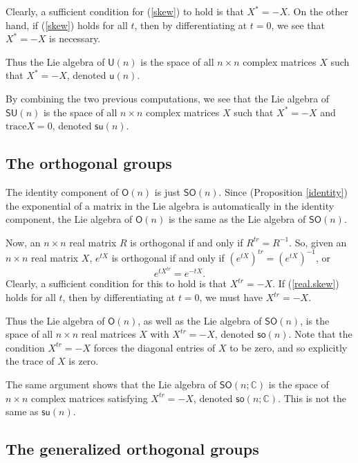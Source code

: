 \documentclass[12pt]{amsbook}
\theoremstyle{plain}
\numberwithin{equation}{chapter}
\numberwithin{theorem}{chapter}
\begin{document}
Clearly, a sufficient condition for (\ref{skew}) to hold is that $X^{*}=-X$.
On the other hand, if (\ref{skew}) holds for all $t$, then by differentiating
at $t=0$, we see that $X^{*}=-X$ is necessary.

Thus the Lie algebra of $\mathsf{U}(n)$ is the space of all $n\times n$
complex matrices $X$ such that $X^{*}=-X$, denoted $\mathsf{u}(n)$.

By combining the two previous computations, we see that the Lie algebra of
$\mathsf{SU}(n)$ is the space of all $n\times n$ complex matrices $X$ such
that $X^{*}=-X$ and $\mathrm{trace}X=0$, denoted $\mathsf{su}(n)$.

\subsection{The orthogonal groups}

The identity component of $\mathsf{O}(n)$ is just $\mathsf{SO}(n)$. Since
(Proposition \ref{identity}) the exponential of a matrix in the Lie algebra is
automatically in the identity component, the Lie algebra of $\mathsf{O}(n) $
is the same as the Lie algebra of $\mathsf{SO}(n)$.

Now, an $n\times n$ real matrix $R$ is orthogonal if and only if
$R^{tr}=R^{-1}$. So, given an $n\times n$ real matrix $X$, $e^{tX}$ is
orthogonal if and only if $(e^{tX})^{tr}=(e^{tX})^{-1}$, or
\begin{equation}
e^{tX^{tr}}=e^{-tX}\text{.}\label{real.skew}%
\end{equation}
Clearly, a sufficient condition for this to hold is that $X^{tr}=-X$. If
(\ref{real.skew}) holds for all $t$, then by differentiating at $t=0$, we must
have $X^{tr}=-X$.

Thus the Lie algebra of $\mathsf{O}(n)$, as well as the Lie algebra of
$\mathsf{SO}(n)$, is the space of all $n\times n$ real matrices $X$ with
$X^{tr}=-X$, denoted $\mathsf{so}(n)$. Note that the condition $X^{tr}=-X$
forces the diagonal entries of $X$ to be zero, and so explicitly the trace of
$X$ is zero.

The same argument shows that the Lie algebra of $\mathsf{SO}(n;\mathbb{C})$ is
the space of $n\times n$ complex matrices satisfying $X^{tr}=-X$, denoted
$\mathsf{so}(n;\mathbb{C})$. This is not the same as $\mathsf{su}(n)$.

\subsection{The generalized orthogonal groups}
\end{document}
